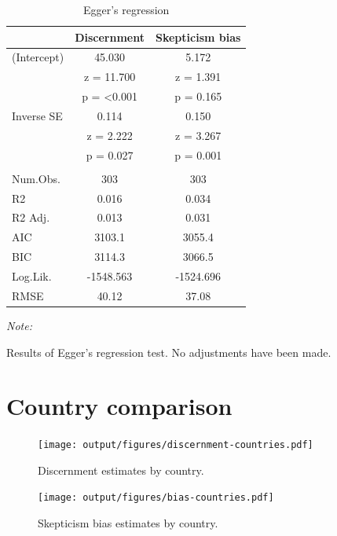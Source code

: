 \documentclass[
  man]{apa6}
\begin{document}
\begin{table}
\centering
\caption{\label{tab:egger}Egger's regression}
\centering
\begin{threeparttable}
\begin{tabular}[t]{lcc}
\toprule
  & Discernment & Skepticism  bias\\
\midrule
(Intercept) & 45.030 & 5.172\\
 & z = 11.700 & z = 1.391\\
 & p = <0.001 & p = 0.165\\
Inverse SE & 0.114 & 0.150\\
 & z = 2.222 & z = 3.267\\
 & p = 0.027 & p = 0.001\\
\midrule\\
Num.Obs. & 303 & 303\\
R2 & 0.016 & 0.034\\
R2 Adj. & 0.013 & 0.031\\
AIC & 3103.1 & 3055.4\\
BIC & 3114.3 & 3066.5\\
Log.Lik. & -1548.563 & -1524.696\\
RMSE & 40.12 & 37.08\\
\bottomrule
\end{tabular}
\begin{tablenotes}
\item \textit{Note: } 
\item Results of Egger's regression test. No adjustments have been made.
\end{tablenotes}
\end{threeparttable}
\end{table}

\clearpage

\section{Country comparison}\label{country-comparison}

\FloatBarrier



\begin{figure}
\centering
\texttt{[image: output/figures/discernment-countries.pdf]}
\caption{\label{fig:discernment-countries}Discernment estimates by country.}
\end{figure}



\begin{figure}
\centering
\texttt{[image: output/figures/bias-countries.pdf]}
\caption{\label{fig:bias-countries}Skepticism bias estimates by country.}
\end{figure}
\end{document}

